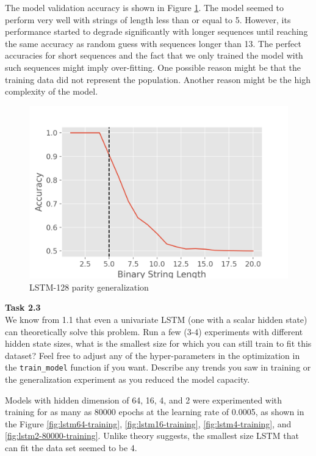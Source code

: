 \documentclass[12pt,article]{article}
\newenvironment{task}[2][Task]
    { \begin{mdframed}[backgroundcolor=gray!20] \textbf{#1 #2} \\}
    {  \end{mdframed}}
\begin{document}
The model validation accuracy is shown in Figure \ref{fig:lstm128-generalization}. The model seemed to perform very well with strings of length less than or equal to 5. However, its performance started to degrade significantly with longer sequences until reaching the same accuracy as random guess with sequences longer than 13. The perfect accuracies for short sequences and the fact that we only trained the model with such sequences might imply over-fitting. One possible reason might be that the training data did not represent the population. Another reason might be the high complexity of the model.

\begin{figure}[H]
    \centering
    \includegraphics[scale=0.5]{LSTM-64_parity_generalization.png} \par
    \caption{LSTM-128 parity generalization}
    \label{fig:lstm128-generalization}
\end{figure}

\begin{task}{2.3} 
We know from 1.1 that even a univariate LSTM (one with a scalar hidden state) can theoretically solve this problem. Run a few (3-4) experiments with different hidden state sizes, what is the smallest size for which you can still train to fit this dataset? Feel free to adjust any of the hyper-parameters in the optimization in the \texttt{train\_model} function if you want. Describe any trends you saw in training or the generalization experiment as you reduced the model capacity.
\end{task}

Models with hidden dimension of 64, 16, 4, and 2 were experimented with training for as many as 80000 epochs at the learning rate of 0.0005, as shown in the Figure \ref{fig:lstm64-training}, \ref{fig:lstm16-training}, \ref{fig:lstm4-training}, and \ref{fig:lstm2-80000-training}. Unlike theory suggests, the smallest size LSTM that can fit the data set seemed to be 4. 
\end{document}
